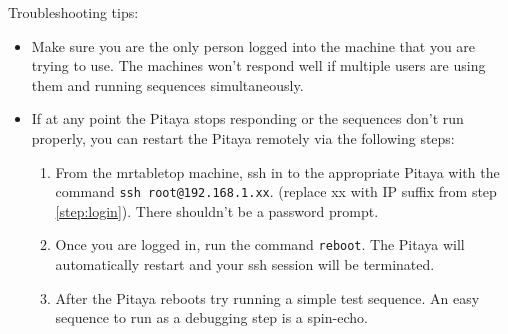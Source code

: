Troubleshooting tips:
\begin{itemize}
    \item   Make sure you are the only person logged into the machine that you are trying to use. The machines won’t respond well if multiple users are using them and running sequences simultaneously.
    \item   If at any point the Pitaya stops responding or the sequences don’t run properly, you can restart the Pitaya remotely via the following steps:
    \begin{enumerate}
        \item   From the mrtabletop machine, ssh in to the appropriate Pitaya with the command \texttt{ssh root@192.168.1.xx}. (replace xx with IP suffix from step \ref{step:login}). There shouldn’t be a password prompt.
        \item   Once you are logged in, run the command \texttt{reboot}. The Pitaya will automatically restart and your ssh session will be terminated.
        \item   After the Pitaya reboots try running a simple test sequence. An easy sequence to run as a debugging step is a spin-echo.
    \end{enumerate}
\end{itemize}





